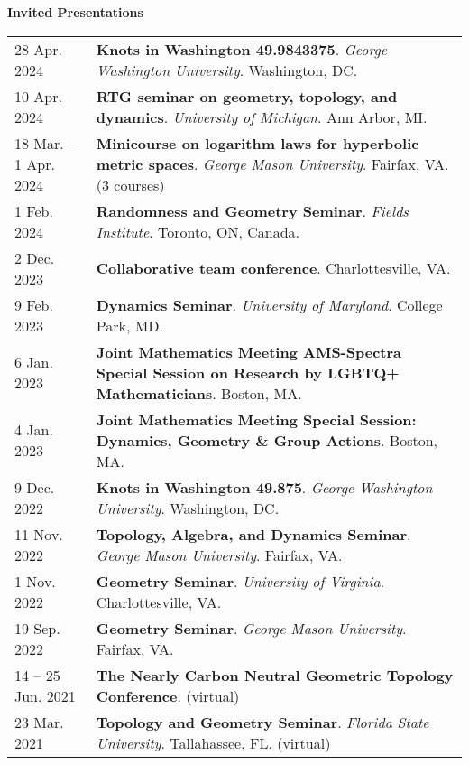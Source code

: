 
    \medskip


    \medskip
    \medskip



    \textbf{\large Invited Presentations}
    
    \begin{center}
    {
    \renewcommand{\arraystretch}{1.5}
    \begin{longtable}{p{}  p{}}
    28 Apr.  2024 & \textbf{Knots in Washington 49.9843375}. \textit{George Washington University}.  Washington, DC.  \\ 
10 Apr.  2024 & \textbf{RTG seminar on geometry, topology, and dynamics}. \textit{University of Michigan}.  Ann Arbor, MI.  \\ 
18 Mar.  -- 1 Apr.  2024 & \textbf{Minicourse on logarithm laws for hyperbolic metric spaces}. \textit{George Mason University}.  Fairfax, VA. (3 courses) \\ 
1 Feb.  2024 & \textbf{Randomness and Geometry Seminar}. \textit{Fields Institute}.  Toronto, ON, Canada.  \\ 
2 Dec.  2023 & \textbf{Collaborative team conference}.  Charlottesville, VA.  \\ 
9 Feb.  2023 & \textbf{Dynamics Seminar}. \textit{University of Maryland}.  College Park, MD.  \\ 
6 Jan.  2023 & \textbf{Joint Mathematics Meeting AMS-Spectra Special Session on Research by LGBTQ+ Mathematicians}.  Boston, MA.  \\ 
4 Jan.  2023 & \textbf{Joint Mathematics Meeting Special Session: Dynamics, Geometry \& Group Actions}.  Boston, MA.  \\ 
9 Dec.  2022 & \textbf{Knots in Washington 49.875}. \textit{George Washington University}.  Washington, DC.  \\ 
11 Nov.  2022 & \textbf{Topology, Algebra, and Dynamics Seminar}. \textit{George Mason University}.  Fairfax, VA.  \\ 
1 Nov.  2022 & \textbf{Geometry Seminar}. \textit{University of Virginia}.  Charlottesville, VA.  \\ 
19 Sep.  2022 & \textbf{Geometry Seminar}. \textit{George Mason University}.  Fairfax, VA.  \\ 
14  -- 25 Jun.  2021 & \textbf{The Nearly Carbon Neutral Geometric Topology Conference}. (virtual) \\ 
23 Mar.  2021 & \textbf{Topology and Geometry Seminar}. \textit{Florida State University}.  Tallahassee, FL. (virtual) \\ 

\end{longtable}}
\end{center}
